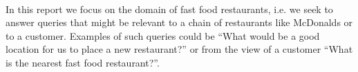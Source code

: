 \paragraph{}
In this report we focus on the domain of fast food restaurants, i.e. we seek to answer queries that might be relevant to a chain of restaurants like McDonalds or to a customer. Examples of such queries could be “What would be a good location for us to place a new restaurant?” or from the view of a customer “What is the nearest fast food restaurant?”. 